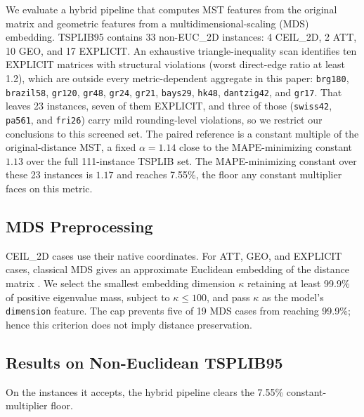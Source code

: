 \documentclass{article}
\begin{document}
We evaluate a hybrid pipeline that computes MST features from the original matrix and geometric features from a multidimensional-scaling (MDS) embedding. TSPLIB95 contains 33 non-EUC\_2D instances: 4 CEIL\_2D, 2 ATT, 10 GEO, and 17 EXPLICIT. An exhaustive triangle-inequality scan identifies ten EXPLICIT matrices with structural violations (worst direct-edge ratio at least 1.2), which are outside every metric-dependent aggregate in this paper: \texttt{brg180}, \texttt{brazil58}, \texttt{gr120}, \texttt{gr48}, \texttt{gr24}, \texttt{gr21}, \texttt{bays29}, \texttt{hk48}, \texttt{dantzig42}, and \texttt{gr17}. That leaves 23 instances, seven of them EXPLICIT, and three of those (\texttt{swiss42}, \texttt{pa561}, and \texttt{fri26}) carry mild rounding-level violations, so we restrict our conclusions to this screened set. The paired reference is a constant multiple of the original-distance MST, a fixed $\alpha=1.14$ close to the MAPE-minimizing constant $1.13$ over the full 111-instance TSPLIB set. The MAPE-minimizing constant over these 23 instances is $1.17$ and reaches 7.55\%, the floor any constant multiplier faces on this metric.

\subsection{MDS Preprocessing}

CEIL\_2D cases use their native coordinates. For ATT, GEO, and EXPLICIT cases, classical MDS gives an approximate Euclidean embedding of the distance matrix \citep{torgerson1952mds,gower1966some,borg2005mds,cox2000mds}. We select the smallest embedding dimension $\kappa$ retaining at least 99.9\% of positive eigenvalue mass, subject to $\kappa\le100$, and pass $\kappa$ as the model's \texttt{dimension} feature. The cap prevents five of 19 MDS cases from reaching 99.9\%; hence this criterion does not imply distance preservation.  

\subsection{Results on Non-Euclidean TSPLIB95}

On the instances it accepts, the hybrid pipeline clears the 7.55\% constant-multiplier floor. 
\end{document}
